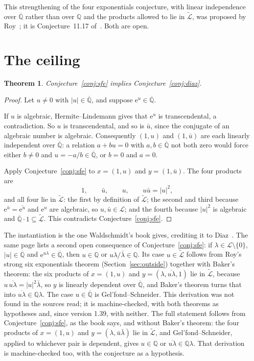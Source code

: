 \documentclass[11pt,a4paper]{article}
\theoremstyle{plain}
\newtheorem{theorem}{Theorem}[section]
\theoremstyle{definition}
\newcommand{\e}{\mathrm{e}}
\newcommand{\Q}{\mathbb{Q}}
\newcommand{\Alg}{\overline{\mathbb{Q}}}
\newcommand{\Logs}{\mathcal{L}}
\newcommand{\aLogs}{\widetilde{\mathcal{L}}}
\begin{document}
This strengthening of the four exponentials conjecture, with linear independence over $\Alg$
rather than over $\Q$ and the products allowed to lie in $\aLogs$, was proposed by
Roy~\cite{roy-1992}; it is Conjecture~11.17 of~\cite{waldschmidt-book}. Both are open.

\section{The ceiling}\label{sec:ceiling}

\begin{theorem}\label{thm:sfe-implies-diaz}
Conjecture~\ref{conj:sfe} implies Conjecture~\ref{conj:diaz}.
\end{theorem}

\begin{proof}
Let $u\neq0$ with $\lvert u\rvert\in\Alg$, and suppose $\e^{u}\in\Alg$.

If $u$ is algebraic, Hermite--Lindemann gives that $\e^{u}$ is transcendental, a
contradiction. So $u$ is transcendental, and so is $\bar u$, since the conjugate of an
algebraic number is algebraic. Consequently $(1,u)$ and $(1,\bar u)$ are each linearly
independent over $\Alg$: a relation $a+bu=0$ with $a,b\in\Alg$ not both zero would force
either $b\neq0$ and $u=-a/b\in\Alg$, or $b=0$ and $a=0$.

Apply Conjecture~\ref{conj:sfe} to $x=(1,u)$ and $y=(1,\bar u)$. The four products are
\[
  1,\qquad \bar u,\qquad u,\qquad u\bar u=\lvert u\rvert^{2},
\]
and all four lie in $\aLogs$: the first by definition of $\aLogs$; the second and third because
$\e^{\bar u}=\overline{\e^{u}}$ and $\e^{u}$ are algebraic, so $u,\bar u\in\Logs$; and the
fourth because $\lvert u\rvert^{2}$ is algebraic and $\Alg\cdot1\subseteq\aLogs$. This
contradicts Conjecture~\ref{conj:sfe}.
\end{proof}

The instantiation is the one Waldschmidt's book gives, crediting it to
Diaz~\cite[p.~399]{waldschmidt-book}. The same page lists a second open consequence of
Conjecture~\ref{conj:sfe}: if $\lambda\in\Logs\setminus\{0\}$, $\lvert u\rvert\in\Alg$ and
$\e^{u\lambda}\in\Alg$, then $u\in\Q$ or $u\lambda/\bar\lambda\in\Q$. Its case $u\in\aLogs$ follows
from Roy's strong six exponentials theorem (Section~\ref{sec:outside}) together with Baker's theorem:
the six products of $x=(1,u)$ and $y=(\lambda,\overline{u\lambda},1)$ lie in $\aLogs$, because
$u\,\overline{u\lambda}=\lvert u\rvert^{2}\bar\lambda$, so $y$ is linearly dependent over $\Alg$,
and Baker's theorem turns that into $\overline{u\lambda}\in\Q\lambda$. The case $u\in\Alg$ is
Gel'fond--Schneider. This derivation was not found in the sources read; it is machine-checked, with
both theorems as hypotheses and, since version 1.39, with neither. The full statement follows from Conjecture~\ref{conj:sfe}, as the book
says, and without Baker's theorem: the four products of $x=(1,u)$ and $y=(\lambda,\bar u\bar\lambda)$
lie in $\aLogs$, and Gel'fond--Schneider, applied to whichever pair is dependent, gives $u\in\Q$ or
$\overline{u\lambda}\in\Q\lambda$. That derivation is machine-checked too, with the conjecture as a
hypothesis.
\end{document}
